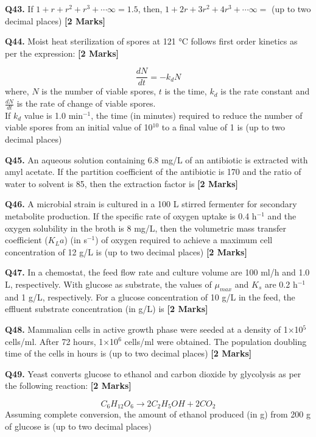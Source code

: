 \documentclass[11pt]{article}
\newcommand{\questionb}[2]{
    \noindent\textbf{Q#2.} #1 \hfill \textbf{[2 Marks]}
}
\begin{document}
\questionb{If \( 1 + r + r^2 + r^3 + \cdots \infty = 1.5 \), then, \( 1 + 2r + 3r^2 + 4r^3 + \cdots \infty = \) (up to two decimal places)}{43}
\vspace{0.5cm}

\questionb{Moist heat sterilization of spores at 121 °C follows first order kinetics as per the expression:}{44}
\[ \frac{dN}{dt} = -k_d N \]
where, \( N \) is the number of viable spores, \( t \) is the time, \( k_d \) is the rate constant and \( \frac{dN}{dt} \) is the rate of change of viable spores. \\
If \( k_d \) value is 1.0 min\(^{-1}\), the time (in minutes) required to reduce the number of viable spores from an initial value of 10\(^{10}\) to a final value of 1 is (up to two decimal places)
\vspace{0.5cm}

\questionb{An aqueous solution containing 6.8 mg/L of an antibiotic is extracted with amyl acetate. If the partition coefficient of the antibiotic is 170 and the ratio of water to solvent is 85, then the extraction factor is}{45}
\vspace{0.5cm}

\questionb{A microbial strain is cultured in a 100 L stirred fermenter for secondary metabolite production. If the specific rate of oxygen uptake is 0.4 h\(^{-1}\) and the oxygen solubility in the broth is 8 mg/L, then the volumetric mass transfer coefficient (\( K_{L}a \)) (in s\(^{-1}\)) of oxygen required to achieve a maximum cell concentration of 12 g/L is (up to two decimal places)}{46}
\vspace{0.5cm}

\questionb{In a chemostat, the feed flow rate and culture volume are 100 ml/h and 1.0 L, respectively. With glucose as substrate, the values of \(\mu_{max}\) and \(K_s\) are 0.2 h\(^{-1}\) and 1 g/L, respectively. For a glucose concentration of 10 g/L in the feed, the effluent substrate concentration (in g/L) is}{47}
\vspace{0.5cm}

\questionb{Mammalian cells in active growth phase were seeded at a density of 1×10\(^5\) cells/ml. After 72 hours, 1×10\(^6\) cells/ml were obtained. The population doubling time of the cells in hours is (up to two decimal places)}{48}
\vspace{0.5cm}

\questionb{Yeast converts glucose to ethanol and carbon dioxide by glycolysis as per the following reaction:}{49}
\[ C_6H_{12}O_6 \rightarrow 2C_2H_5OH + 2CO_2 \]
Assuming complete conversion, the amount of ethanol produced (in g) from 200 g of glucose is (up to two decimal places)
\vspace{0.5cm}
\end{document}
